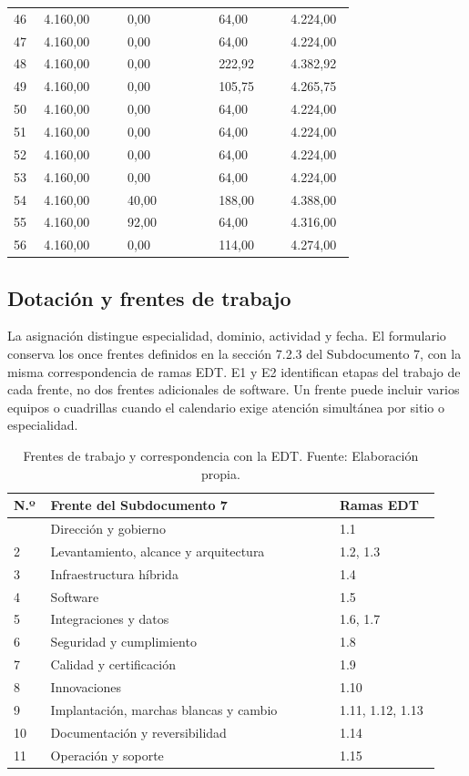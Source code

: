 \documentclass[11pt]{article}
\begin{document}
\begin{longtable}{@{}p{0.08\linewidth}p{0.22\linewidth}p{0.24\linewidth}p{0.19\linewidth}p{0.17\linewidth}@{}}
46 & 4.160,00 & 0,00 & 64,00 & 4.224,00 \\
47 & 4.160,00 & 0,00 & 64,00 & 4.224,00 \\
48 & 4.160,00 & 0,00 & 222,92 & 4.382,92 \\
49 & 4.160,00 & 0,00 & 105,75 & 4.265,75 \\
50 & 4.160,00 & 0,00 & 64,00 & 4.224,00 \\
51 & 4.160,00 & 0,00 & 64,00 & 4.224,00 \\
52 & 4.160,00 & 0,00 & 64,00 & 4.224,00 \\
53 & 4.160,00 & 0,00 & 64,00 & 4.224,00 \\
54 & 4.160,00 & 40,00 & 188,00 & 4.388,00 \\
55 & 4.160,00 & 92,00 & 64,00 & 4.316,00 \\
56 & 4.160,00 & 0,00 & 114,00 & 4.274,00 \\
\end{longtable}
\endgroup

\subsection{Dotación y frentes de trabajo}

La asignación distingue especialidad, dominio, actividad y fecha. El formulario conserva los once frentes definidos en la sección 7.2.3 del Subdocumento 7, con la misma correspondencia de ramas EDT. E1 y E2 identifican etapas del trabajo de cada frente, no dos frentes adicionales de software. Un frente puede incluir varios equipos o cuadrillas cuando el calendario exige atención simultánea por sitio o especialidad.

\begingroup
\small
\begin{longtable}{@{}p{0.08\linewidth}p{0.63\linewidth}p{0.22\linewidth}@{}}
\caption[Frentes de trabajo y correspondencia con la EDT]{Frentes de trabajo y correspondencia con la EDT. Fuente: Elaboración propia.}\label{tab:t15-once-frentes}\\
\toprule
\textbf{N.º} & \textbf{Frente del Subdocumento 7} & \textbf{Ramas EDT} \\
\midrule
\endhead
\bottomrule
\endlastfoot
1 & Dirección y gobierno & 1.1 \\
2 & Levantamiento, alcance y arquitectura & 1.2, 1.3 \\
3 & Infraestructura híbrida & 1.4 \\
4 & Software & 1.5 \\
5 & Integraciones y datos & 1.6, 1.7 \\
6 & Seguridad y cumplimiento & 1.8 \\
7 & Calidad y certificación & 1.9 \\
8 & Innovaciones & 1.10 \\
9 & Implantación, marchas blancas y cambio & 1.11, 1.12, 1.13 \\
10 & Documentación y reversibilidad & 1.14 \\
11 & Operación y soporte & 1.15 \\
\end{longtable}
\endgroup
\end{document}
